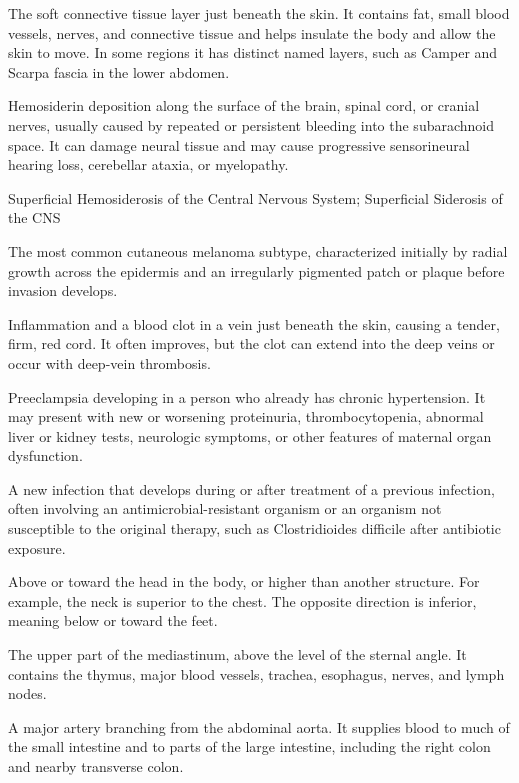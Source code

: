  The soft connective tissue layer just beneath the skin. It contains fat, small blood vessels, nerves, and connective tissue and helps insulate the body and allow the skin to move. In some regions it has distinct named layers, such as Camper and Scarpa fascia in the lower abdomen.

 Hemosiderin deposition along the surface of the brain, spinal cord, or cranial nerves, usually caused by repeated or persistent bleeding into the subarachnoid space. It can damage neural tissue and may cause progressive sensorineural hearing loss, cerebellar ataxia, or myelopathy.

\synonyms
Superficial Hemosiderosis of the Central Nervous System; Superficial Siderosis of the CNS

 The most common cutaneous melanoma subtype, characterized initially by radial growth across the epidermis and an irregularly pigmented patch or plaque before invasion develops.

 Inflammation and a blood clot in a vein just beneath the skin, causing a tender, firm, red cord. It often improves, but the clot can extend into the deep veins or occur with deep-vein thrombosis.

 Preeclampsia developing in a person who already has chronic hypertension. It may
present with new or worsening proteinuria, thrombocytopenia, abnormal liver or kidney tests, neurologic symptoms, or
other features of maternal organ dysfunction.

 A new infection that develops during or after treatment of a previous infection, often
involving an antimicrobial-resistant organism or an organism not susceptible to the
original therapy, such as Clostridioides difficile after antibiotic exposure.

 Above or toward the head in the body, or higher than another structure. For example, the neck is superior to the chest. The opposite direction is inferior, meaning below or toward the feet.

 The upper part of the mediastinum, above the level of the sternal angle. It contains the thymus, major blood vessels, trachea, esophagus, nerves, and lymph nodes.

 A major artery branching from the abdominal aorta. It supplies blood to much of the small intestine and to parts of the large intestine, including the right colon and nearby transverse colon.

